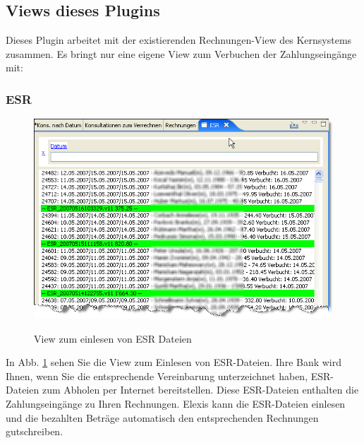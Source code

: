 \subsection{Views dieses Plugins}
Dieses Plugin arbeitet mit der existierenden Rechnungen-View des Kernsystems zusammen. Es bringt nur eine eigene View zum Verbuchen der Zahlungseingänge mit:

\subsubsection{ESR}
\begin{figure}[hb]
  \includegraphics{images/esr1}\\
  \caption{View zum einlesen von ESR Dateien}\label{fig:esr}
\end{figure}

In Abb. \ref{fig:esr} sehen Sie die View zum Einlesen von ESR-Dateien. Ihre Bank wird Ihnen, wenn Sie die entsprechende Vereinbarung unterzeichnet haben, ESR-Dateien zum Abholen per Internet bereitstellen. Diese ESR-Dateien enthalten die Zahlungseingänge zu Ihren Rechnungen. Elexis kann die ESR-Dateien einlesen und die bezahlten Beträge automatisch den entsprechenden Rechnungen gutschreiben.

